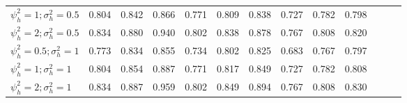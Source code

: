 \begin{table}[ht]
{\begin{tabular}{l c c c c c c c c c c c c}
$\psi_h^2 = 1; \sigma_h^2 = 0.5$ & 0.804 & 0.842 & 0.866 & 0.771 & 0.809 & 0.838 & 0.727 & 0.782 & 0.798 \\
$\psi_h^2 = 2; \sigma_h^2 = 0.5$ & 0.834 & 0.880 & 0.940 & 0.802 & 0.838 & 0.878 & 0.767 & 0.808 & 0.820 \\
$\psi_h^2 = 0.5; \sigma_h^2 = 1$ & 0.773 & 0.834 & 0.855 & 0.734 & 0.802 & 0.825 & 0.683 & 0.767 & 0.797 \\
$\psi_h^2 = 1; \sigma_h^2 = 1$ & 0.804 & 0.854 & 0.887 & 0.771 & 0.817 & 0.849 & 0.727 & 0.782 & 0.808 \\
$\psi_h^2 = 2; \sigma_h^2 = 1$ & 0.834 & 0.887 & 0.959 & 0.802 & 0.849 & 0.894 & 0.767 & 0.808 & 0.830 \\
\bottomrule
\end{tabular}}
\end{table}

